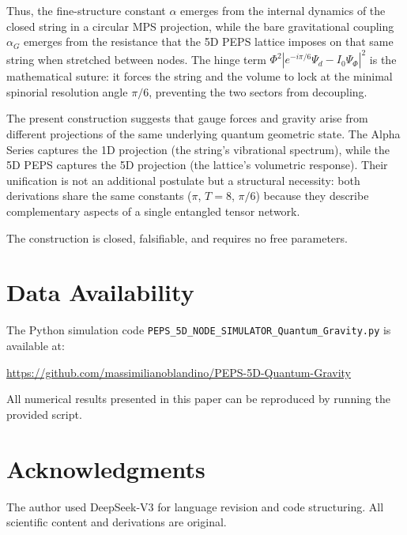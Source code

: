 \documentclass[12pt]{article}
\begin{document}
Thus, the fine-structure constant \(\alpha\) emerges from the internal dynamics of the closed string in a circular MPS projection, while the bare gravitational coupling \(\alpha_G\) emerges from the resistance that the 5D PEPS lattice imposes on that same string when stretched between nodes. The hinge term \(\Phi^2 |e^{-i\pi/6}\Psi_d - I_0\Psi_\Phi|^2\) is the mathematical suture: it forces the string and the volume to lock at the minimal spinorial resolution angle \(\pi/6\), preventing the two sectors from decoupling.

The present construction suggests that gauge forces and gravity arise from different projections of the same underlying quantum geometric state. The Alpha Series captures the 1D projection (the string's vibrational spectrum), while the 5D PEPS captures the 5D projection (the lattice's volumetric response). Their unification is not an additional postulate but a structural necessity: both derivations share the same constants (\(\pi\), \(T=8\), \(\pi/6\)) because they describe complementary aspects of a single entangled tensor network.

The construction is closed, falsifiable, and requires no free parameters.

\section*{Data Availability}

The Python simulation code \texttt{PEPS\_5D\_NODE\_SIMULATOR\_Quantum\_Gravity.py} is available at:
\begin{center}
\href{https://github.com/massimilianoblandino/PEPS-5D-Quantum-Gravity}{https://github.com/massimilianoblandino/PEPS-5D-Quantum-Gravity}
\end{center}
All numerical results presented in this paper can be reproduced by running the provided script.

\section*{Acknowledgments}

The author used DeepSeek-V3 for language revision and code structuring. All scientific content and derivations are original.

\newpage
\end{document}
